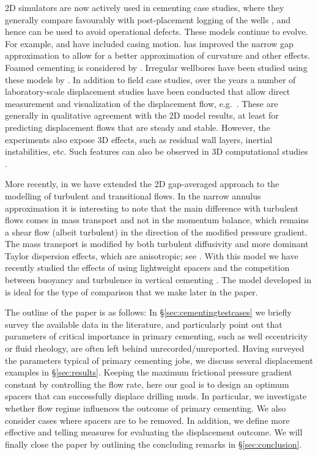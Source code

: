 \documentclass[review]{elsarticle}
\begin{document}
2D simulators are now actively used in cementing case studies, where they generally compare favourably with post-placement logging of the wells \citep{Osayande2004,Bogaerts2015,Gregatti2015,Guo2015}, and hence can be used to avoid operational defects. These models continue to evolve. For example, \cite{Carrasco2010} and \cite{Tardy2015} have included casing motion. \citet{Tardy2018} has improved the narrow gap approximation to allow for a better approximation of curvature and other effects. Foamed cementing is considered by \citet{Hanachi2018}. Irregular wellbores have been studied using these models by \citet{Renteria2018}. In addition to field case studies, over the years a number of laboratory-scale displacement studies have been conducted that allow direct measurement and visualization of the displacement flow, e.g.~\cite{tehrani1993,malekmohammadi2010}. These are generally in qualitative agreement with the 2D model results, at least for predicting displacement flows that are steady and stable. However, the experiments also expose 3D effects, such as residual wall layers, inertial instabilities, etc. Such features can also be observed in 3D computational studies \citep{enayatpour2017,skadsem2018}.

More recently, in \citet{Maleki2017} we have extended the 2D gap-averaged approach to the modelling of turbulent and transitional flows. In the narrow annulus approximation it is interesting to note that the main difference with turbulent flows comes in mass transport and not in the momentum balance, which remains a shear flow (albeit turbulent) in the direction of the modified pressure gradient. The mass transport is modified by both turbulent diffusivity and more dominant Taylor dispersion effects, which are anisotropic; see \cite{Maleki2017}. With this model we have recently studied the effects of using lightweight spacers \citep{Maleki2018a} and the competition between buoyancy and turbulence in vertical cementing \citep{Maleki2018b}. The model developed in \citet{Maleki2017} is ideal for the type of comparison that we make later in the paper.

The outline of the paper is as follows: In \S \ref{sec:cementingtestcases} we briefly survey the available data in the literature, and particularly point out that parameters of critical importance in primary cementing, such as well eccentricity or fluid rheology, are often left behind unrecorded/unreported. Having surveyed the parameters typical of primary cementing jobs, we discuss several displacement examples in \S \ref{sec:results}. Keeping the maximum frictional pressure gradient constant by controlling the flow rate, here our goal is to design an optimum spacers that can successfully displace drilling muds. In particular, we investigate whether flow regime influences the outcome of primary cementing. We also consider cases where spacers are to be removed. In addition, we define more effective and telling measures for evaluating the displacement outcome. We will finally close the paper by outlining the concluding remarks in \S \ref{sec:conclusion}.
\end{document}
